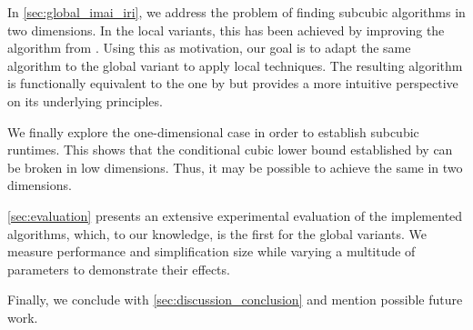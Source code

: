 In \cref{sec:global_imai_iri}, we address the problem of finding subcubic algorithms in two dimensions. In the local variants, this has been achieved by improving the algorithm from \citeauthor{computational_geometric_methods_for_polygonal_approximations_of_a_curve}. Using this as motivation, our goal is to adapt the same algorithm to the global variant to apply local techniques. The resulting algorithm is functionally equivalent to the one by \citeauthor{global_curve_simplification} but provides a more intuitive perspective on its underlying principles.

We finally explore the one-dimensional case in order to establish subcubic runtimes. This shows that the conditional cubic lower bound established by \citeauthor{polyline_simplification_has_cubic_complexity_bringmannetal} can be broken in low dimensions. Thus, it may be possible to achieve the same in two dimensions.

\cref{sec:evaluation} presents an extensive experimental evaluation of the implemented algorithms, which, to our knowledge, is the first for the global variants. We measure performance and simplification size while varying a multitude of parameters to demonstrate their effects.

Finally, we conclude with \cref{sec:discussion_conclusion} and mention possible future work.
 
